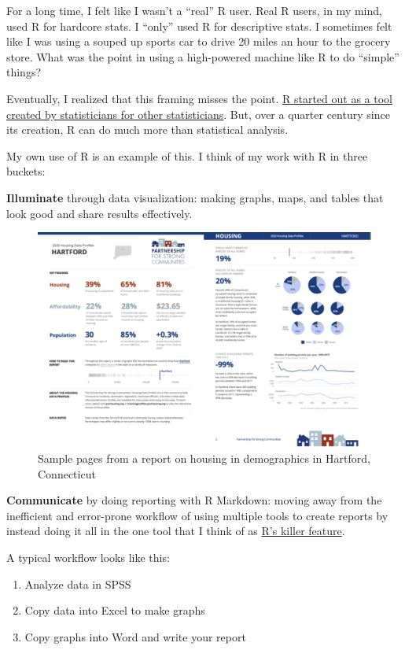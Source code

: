 \documentclass[
]{book}
\providecommand{\tightlist}{%
  \setlength{\itemsep}{0pt}\setlength{\parskip}{0pt}}
\begin{document}
For a long time, I felt like I wasn't a ``real'' R user. Real R users, in my mind, used R for hardcore stats. I ``only'' used R for descriptive stats. I sometimes felt like I was using a souped up sports car to drive 20 miles an hour to the grocery store. What was the point in using a high-powered machine like R to do ``simple'' things?

Eventually, I realized that this framing misses the point. \href{https://rss.onlinelibrary.wiley.com/doi/10.1111/j.1740-9713.2018.01169.x}{R started out as a tool created by statisticians for other statisticians}. But, over a quarter century since its creation, R can do much more than statistical analysis.

My own use of R is an example of this. I think of my work with R in three buckets:

\textbf{Illuminate} through data visualization: making graphs, maps, and tables that look good and share results effectively.

\begin{figure}
\includegraphics[width=1\linewidth]{assets/psc-sample} \caption{Sample pages from a report on housing in demographics in Hartford, Connecticut}\label{fig:unnamed-chunk-7}
\end{figure}

\textbf{Communicate} by doing reporting with R Markdown: moving away from the inefficient and error-prone workflow of using multiple tools to create reports by instead doing it all in the one tool that I think of as \href{https://rfortherestofus.com/2019/03/r-killer-feature-rmarkdown/}{R's killer feature}.

A typical workflow looks like this:

\begin{enumerate}
\def\labelenumi{\arabic{enumi}.}
\tightlist
\item
  Analyze data in SPSS
\item
  Copy data into Excel to make graphs
\item
  Copy graphs into Word and write your report
\end{enumerate}
\end{document}
